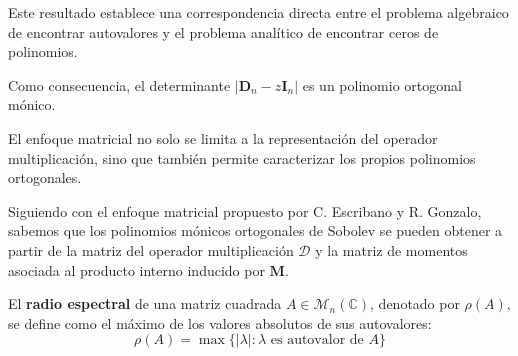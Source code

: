 Este resultado establece una correspondencia directa entre el problema algebraico de encontrar autovalores y el problema analítico de encontrar ceros de polinomios.

\noindent Como consecuencia, el determinante $|\mathbf{D}_n -z \mathbf{I}_n|$ es un polinomio ortogonal mónico.

El enfoque matricial no solo se limita a la representación del operador multiplicación, sino que también permite caracterizar los propios polinomios ortogonales.

Siguiendo con el enfoque matricial propuesto por C. Escribano y R. Gonzalo, sabemos que los polinomios mónicos ortogonales de Sobolev se pueden obtener a partir de la matriz del operador multiplicación $\mathcal{D}$ y la matriz de momentos asociada al producto interno inducido por $\mathbf{M}$.

\begin{definition}\label{def:spectral_radius}
	\cite{dunford1963linear} El \textbf{radio espectral} de una matriz cuadrada $A \in \mathcal{M}_{n}(\mathbb{C})$, denotado por $\rho(A)$, se define como el máximo de los valores absolutos de sus autovalores:
	\begin{equation}
		\rho(A) = \max\{|\lambda| : \lambda \text{ es autovalor de } A\}
	\end{equation}
\end{definition}

